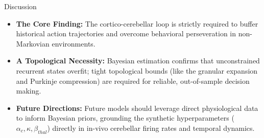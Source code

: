 \documentclass{beamer}
\begin{document}
\begin{frame}{Discussion}
    \begin{itemize}
        \setlength\itemsep{1.5em}
        \item \textbf{The Core Finding:} The cortico-cerebellar loop is strictly required to buffer historical action trajectories and overcome behavioral perseveration in non-Markovian environments.
        \item \textbf{A Topological Necessity:} Bayesian estimation confirms that unconstrained recurrent states overfit; tight topological bounds (like the granular expansion and Purkinje compression) are required for reliable, out-of-sample decision making.
        \item \textbf{Future Directions:} Future models should leverage direct physiological data to inform Bayesian priors, grounding the synthetic hyperparameters ($\alpha_c, \kappa, \beta_{thal}$) directly in in-vivo cerebellar firing rates and temporal dynamics.
    \end{itemize}
\end{frame}
\end{document}

